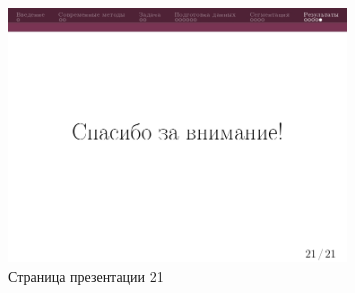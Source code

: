 \documentclass[14pt, a4paper]{extreport}
\begin{document}
	\begin{figure}[h!]
		\centering
		\includegraphics[width = 0.8\textwidth]{image/процентовка1_page-0021}	
		\caption{Страница презентации 21}
	\end{figure}
\end{document}
